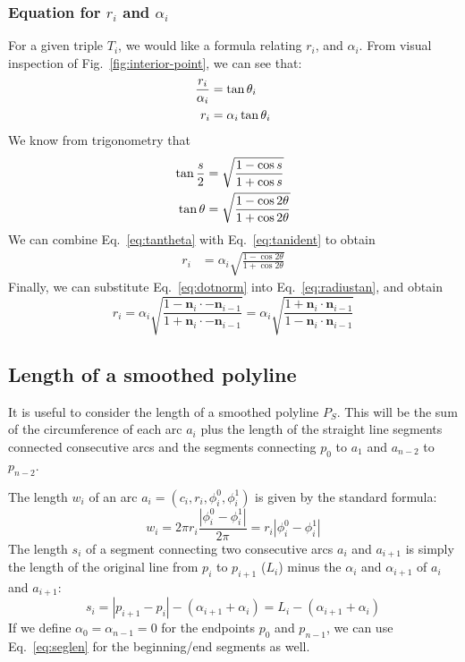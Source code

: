 \documentclass{article}
\begin{document}
\subsubsection{Equation for $r_i$ and $\alpha_{i}$}
%
For a given triple $T_{i}$, we would like a formula relating $r_{i}$, and $\alpha_{i}$.  From visual inspection of Fig.~\ref{fig:interior-point}, we can see that:
%
\begin{align}
  \notag
  \frac{r_i}{\alpha_{i}} &= \tan \theta_i\\
  \label{eq:tantheta}
  r_i &= \alpha_{i}\tan \theta_i
\end{align}
%
We know from trigonometry that
%
\begin{align}
  \notag
  \tan \frac{s}{2} &= \sqrt{\frac{1-\cos s}{1+\cos s}}\\
  \label{eq:tanident}
  \tan \theta &= \sqrt{\frac{1-\cos 2\theta}{1+\cos 2\theta}}
\end{align}
%
We can combine Eq.~\eqref{eq:tantheta} with Eq.~\eqref{eq:tanident} to obtain
%
\begin{align}
  \label{eq:radiustan}
  r_{i} &= \alpha_i\sqrt{\frac{1-\cos 2\theta}{1+\cos 2\theta}}
\end{align}
%
Finally, we can substitute Eq.~\eqref{eq:dotnorm} into Eq.~\eqref{eq:radiustan}, and obtain
%
\begin{equation}
  \label{eq:radius-alpha}
  r_{i} = \alpha_i\sqrt{\frac{1-\mathbf{n}_i\cdot -\mathbf{n}_{i-1}}{1+\mathbf{n}_i\cdot -\mathbf{n}_{i-1}}} = \alpha_i\sqrt{\frac{1+\mathbf{n}_i\cdot \mathbf{n}_{i-1}}{1-\mathbf{n}_i\cdot \mathbf{n}_{i-1}}}
\end{equation}
%
\subsection{Length of a smoothed polyline}
%
It is useful to consider the length of a smoothed polyline $P_S$.  This will be the sum of the circumference of each arc $a_i$ plus the length of the straight line segments connected consecutive arcs and the segments connecting $p_0$ to $a_1$ and $a_{n-2}$ to $p_{n-2}$.

The length $w_i$ of an arc $a_i = \left(c_i, r_i, \phi^0_i, \phi^1_i\right)$ is given by the standard formula:
%
\begin{equation}
  \label{eq:circumference}
  w_i  = 2\pi r_i \frac{\left|\phi^0_i - \phi^1_i\right|}{2\pi} = r_i \left|\phi^0_i - \phi^1_i\right|
\end{equation}
%
The length $s_i$ of a segment connecting two consecutive arcs $a_{i}$ and $a_{i+1}$ is simply the length of the original line from $p_i$ to $p_{i+1}$ ($L_i$) minus the $\alpha_i$ and $\alpha_{i+1}$ of $a_i$ and $a_{i+1}$:
%
\begin{equation}
  \label{eq:seglen}
  s_i = \left|p_{i+1} - p_{i}\right| - (\alpha_{i+1} + \alpha_{i}) = L_{i} - (\alpha_{i+1} + \alpha_{i})
\end{equation}
%
If we define $\alpha_0 = \alpha_{n-1} = 0$ for the endpoints $p_0$ and $p_{n-1}$, we can use Eq.~\eqref{eq:seglen} for the beginning/end segments as well.
\end{document}
